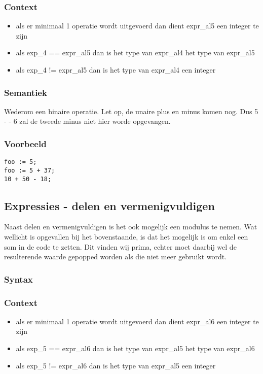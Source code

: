 \documentclass[]{article}
\begin{document}
\subsubsection{Context}
\begin{itemize}
\item als er minimaal 1 operatie wordt uitgevoerd dan dient expr\_al5 een integer te zijn
\item als exp\_4 == expr\_al5 dan is het type van expr\_al4 het type van expr\_al5
\item als exp\_4 != expr\_al5 dan is het type van expr\_al4 een integer
\end{itemize}
\subsubsection{Semantiek}
Wederom een binaire operatie. Let op, de unaire plus en minus komen nog. Dus 5 - - 6 zal de tweede minus niet hier worde opgevangen.
\subsubsection{Voorbeeld}
\begin{lstlisting}[style=SELMA]
foo := 5;
foo := 5 + 37;
10 + 50 - 18;
\end{lstlisting}

\subsection{Expressies - delen en vermenigvuldigen}
Naast delen en vermenigvuldigen is het ook mogelijk een modulus te nemen.
Wat wellicht is opgevallen bij het bovenstaande, is dat het mogelijk is om enkel een som in de code te zetten. Dit vinden wij prima, echter moet daarbij wel de resulterende waarde gepopped worden als die niet meer gebruikt wordt.
\subsubsection{Syntax}

\subsubsection{Context}
\begin{itemize}
\item als er minimaal 1 operatie wordt uitgevoerd dan dient expr\_al6 een integer te zijn
\item als exp\_5 == expr\_al6 dan is het type van expr\_al5 het type van expr\_al6
\item als exp\_5 != expr\_al6 dan is het type van expr\_al5 een integer
\end{itemize}
\end{document}
